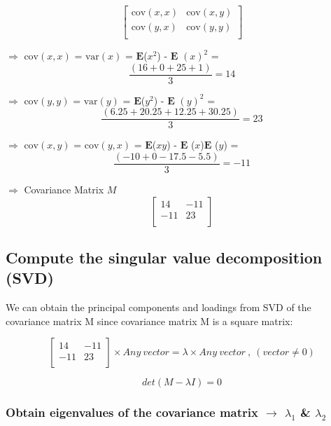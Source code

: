 \documentclass[
  letterpaper,
  DIV=11,
  numbers=noendperiod]{scrreprt}
\begin{document}
\[
\begin{bmatrix}
\text{cov}(x,x) & \text{cov}(x,y) \\
\text{cov}(y,x) & \text{cov}(y,y) \\
\end{bmatrix}
\]

\(\Rightarrow\) \(\text{cov}(x,x)\) = \(\text{var}(x)\) =
\(\mathbf{E}\)(\(x^2\)) - \(\mathbf{E}\) \((x)^2\) =
\[ \frac{(16+0+25+1)}{3}=14 \]

\(\Rightarrow\) \(\text{cov}(y,y)\) = \(\text{var}(y)\) =
\(\mathbf{E}\)(\(y^2\)) - \(\mathbf{E}\) \((y)^2\) =
\[ \frac{(6.25+20.25+12.25+30.25)}{3}=23 \]

\(\Rightarrow\) \(\text{cov}(x,y)\) = \(\text{cov}(y,x)\) =
\(\mathbf{E}\)(\(xy\)) - \(\mathbf{E}\) (\(x\))\(\mathbf{E}\) (\(y\)) =
\[ \frac{(-10+0-17.5-5.5)}{3}=-11 \]

\(\Rightarrow\) Covariance Matrix \(M\) \[ 
\begin{bmatrix}
14 & -11 \\
-11 & 23 \\
\end{bmatrix} \]

\hypertarget{compute-the-singular-value-decomposition-svd}{%
\subsection{Compute the singular value decomposition
(SVD)}\label{compute-the-singular-value-decomposition-svd}}

We can obtain the principal components and loadings from SVD of the
covariance matrix M since covariance matrix M is a square matrix:

\[ 
\begin{bmatrix}
14 & -11 \\
-11 & 23 \\
\end{bmatrix} \times Any\ vector = \lambda \times Any\ vector\ ,\ (vector\neq 0) 
\]

\[det(M - \lambda I) = 0\]

\hypertarget{obtain-eigenvalues-of-the-covariance-matrix-rightarrow-lambda_1-lambda_2}{%
\subsubsection{\texorpdfstring{Obtain eigenvalues of the covariance
matrix \(\rightarrow\) \(\lambda_1\) \&
\(\lambda_2\)}{Obtain eigenvalues of the covariance matrix \textbackslash rightarrow \textbackslash lambda\_1 \& \textbackslash lambda\_2}}\label{obtain-eigenvalues-of-the-covariance-matrix-rightarrow-lambda_1-lambda_2}}
\end{document}
